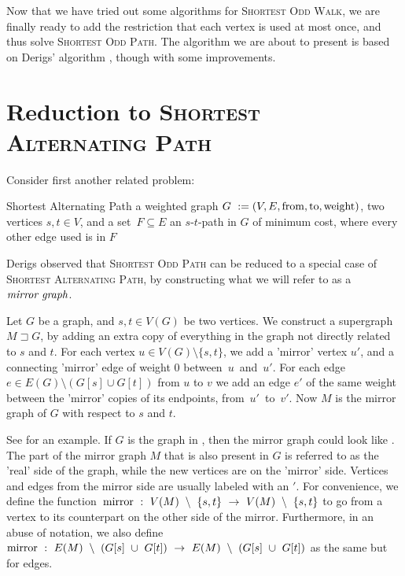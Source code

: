 Now that we have tried out some algorithms for \textsc{Shortest Odd Walk}, we are finally ready to add the restriction that each vertex is used at most once, and thus solve \textsc{Shortest Odd Path}. The algorithm we are about to present is based on Derigs' algorithm \cite{source:derigs_shortest_odd_path}, though with some improvements.

\section{Reduction to \textsc{Shortest Alternating Path}}
\label{subsection:reduction}
Consider first another related problem:

\problem
{Shortest Alternating Path}
{a weighted graph $G~:= (V, E, \operatorname{from}, \operatorname{to}, \operatorname{weight})$, two vertices $s,t \in V$, and a set~$F \subseteq E$}
{an $s$-$t$-path in $G$ of minimum cost, where every other edge used is in $F$}

Derigs observed that \textsc{Shortest Odd Path} can be reduced to a special case of \textsc{Shortest Alternating Path}, by constructing what we will refer to as a $\emph{mirror graph}$. 

\begin{definition}
    \label{def:mirror-graph}
    Let $G$ be a graph, and $s,t \in V(G)$ be two vertices. We construct a supergraph $M \sqsupset G$, by adding an extra copy of everything in the graph not directly related to $s$ and $t$. For each vertex $u \in V(G) \setminus \{s,t\}$, we add a 'mirror' vertex $u'$, and a connecting 'mirror' edge of weight 0 between~$u$~and~$u'$. For each edge $e \in E(G) \setminus (G[s] \cup G[t])$ from $u$ to $v$ we add an edge $e'$ of the same weight between the 'mirror' copies of its endpoints, from~$u'$~to~$v'$.
    Now $M$ is the mirror graph of $G$ with respect to $s$ and $t$.
\end{definition}

See  for an example. If $G$ is the graph in , then the mirror graph could look like . The part of the mirror graph $M$ that is also present in $G$ is referred to as the 'real' side of the graph, while the new vertices are on the 'mirror' side. Vertices and edges from the mirror side are usually labeled with an $'$. For convenience, we define the function~$\operatorname{mirror}~:~V(M)~\setminus~\{s,t\}~\rightarrow~V(M)~\setminus~\{s,t\}$ to go from a vertex to its counterpart on the other side of the mirror. Furthermore, in an abuse of notation, we also define~$\operatorname{mirror}~:~E(M)~\setminus~(G[s]~\cup~G[t])~\rightarrow~E(M)~\setminus~(G[s]~\cup~G[t])$ as the same but for edges.

